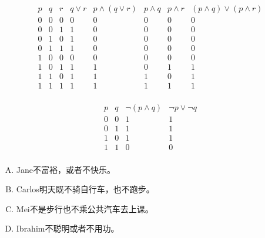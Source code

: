 {{        %
        \begin{practices}
            \begin{table}[H]
                \[
                    \begin{array}{c|c|c|c|c|c|c|c}
                        \hline
                        p & q & r & q \vee r & p \wedge (q \vee r) & p \wedge q & p \wedge r & (p \wedge q) \vee (p \wedge r) \\
                        \hline
                        0 & 0 & 0 & 0 & 0 & 0 & 0 & 0 \\
                        0 & 0 & 1 & 1 & 0 & 0 & 0 & 0 \\
                        0 & 1 & 0 & 1 & 0 & 0 & 0 & 0 \\
                        0 & 1 & 1 & 1 & 0 & 0 & 0 & 0 \\
                        1 & 0 & 0 & 0 & 0 & 0 & 0 & 0 \\
                        1 & 0 & 1 & 1 & 1 & 0 & 1 & 1 \\
                        1 & 1 & 0 & 1 & 1 & 1 & 0 & 1 \\
                        1 & 1 & 1 & 1 & 1 & 1 & 1 & 1 \\
                    \end{array}
                \]
            \end{table}
        \end{practices}

        \begin{practices}
            \begin{table}[H]
                \[
                    \begin{array}{c|c|c|c}
                        \hline
                        p & q & \neg (p \wedge q) & \neg p \vee \neg q \\
                        \hline
                        0 & 0 & 1 & 1 \\
                        0 & 1 & 1 & 1 \\
                        1 & 0 & 1 & 1 \\
                        1 & 1 & 0 & 0 \\
                    \end{array}
                \]
            \end{table}
        \end{practices}

        \begin{practices}
            \begin{enumerate}[A.]
                \item Jane不富裕，或者不快乐。
                \item Carlos明天既不骑自行车，也不跑步。
                \item Mei不是步行也不乘公共汽车去上课。
                \item Ibrahim不聪明或者不用功。
            \end{enumerate}
        \end{practices}

}}
